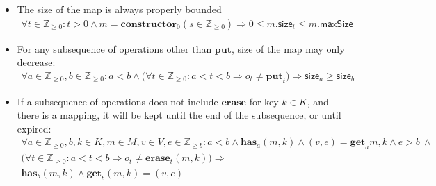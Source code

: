 \documentclass{article}
\renewcommand{\o}[1]{\ensuremath{\mathbf{#1}}}
\newcommand{\s}[1]{\ensuremath{\mathsf{#1}}}
\newcommand{\nintset}{\ensuremath{\mathds{Z}_{\ge 0}}}
\newcommand{\moreset}[1]{\ensuremath{\mathds{Z}_{\ge #1}}}
\begin{document}
\begin{itemize}
\item The size of the map is always properly bounded
  \begin{gather*}
    \forall t\in \nintset: t>0  \wedge m=\o{constructor}_0(s \in \nintset) \Rightarrow 0 \le m.\s{size}_t \le m.\s{maxSize}
  \end{gather*}

\item For any subsequence of operations other than \o{put}, size of the map may only decrease:
  \begin{gather*}
    \forall a\in \nintset,b\in \nintset: a<b \wedge \big(\forall t\in \nintset:a<t<b \Rightarrow o_t \neq \o{put}_t \big) \Rightarrow \s{size}_a \ge \s{size}_b
  \end{gather*}

\item If a subsequence of operations does not include \o{erase} for key $k\in K$, and there is a mapping, it will be kept until the end of the subsequence, or until expired:
  \begin{gather*}
    \forall a\in \nintset,b, k\in K, m\in M, v\in V, e\in \moreset{b}: a < b \wedge \o{has}_a(m, k) \wedge (v, e)=\o{get}_a{m, k} \wedge e > b ~ \wedge\nonumber\\
    \big(\forall t\in \nintset: a<t<b \Rightarrow o_t\neq \o{erase}_t(m, k)\big) \Rightarrow\nonumber\\
    \o{has}_b(m, k) \wedge \o{get}_b(m, k) = (v,e)
  \end{gather*}

\end{itemize}
\end{document}
